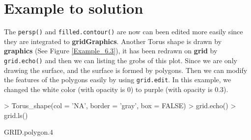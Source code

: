 \documentclass[11pt]{report}
\begin{document}
\section{Example to solution}
The \texttt{persp()} and \texttt{filled.contour()} are now can been edited more easily since they are integrated to \textbf{gridGraphics}. Another Torus shape is drawn by \textbf{graphics} (See Figure \ref{Example_6.3}), it has been redrawn on \textbf{grid} by \texttt{grid.echo()} and then we can listing the grobs of this plot. Since we are only drawing the surface, and the surface is formed by polygons. Then we can modify the features of the polygons easily by using \texttt{grid.edit}. In this example, we changed the white color (with opacity is 0) to purple (with opacity is 0.3).\\
\begin{Schunk}
\begin{Sinput}
> Torus_shape(col = 'NA', border = 'gray', box = FALSE)
> grid.echo()
> grid.ls()
\end{Sinput}
\begin{Soutput}
GRID.polygon.4
\end{Soutput}
\end{Schunk}
\end{document}
